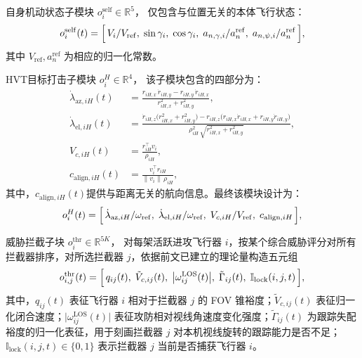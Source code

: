 自身机动状态子模块 $o_i^{\mathrm{self}}\in\mathbb{R}^{5}$，
仅包含与位置无关的本体飞行状态：
\begin{equation}
o_i^{\mathrm{self}}(t)=\Bigl[\,V_i/V_{\mathrm{ref}},\;\sin\gamma_i,\;\cos\gamma_i,\;a_{n,\gamma,i}/a^{\mathrm{ref}}_n,\;a_{n,\psi,i}/a^{\mathrm{ref}}_n\,\Bigr],
\label{eq:obs-self}
\end{equation}
其中 $V_{\mathrm{ref}},a^{\mathrm{ref}}_n$ 为相应的归一化常数。

HVT目标打击子模块 $o_i^{H}\in\mathbb{R}^{4}$，
该子模块包含的四部分为：
\begin{align}
\dot\lambda_{\mathrm{az},iH}(t)&=\frac{r_{iH,x}\,\dot r_{iH,y}-r_{iH,y}\,\dot r_{iH,x}}{r_{iH,x}^{2}+r_{iH,y}^{2}},
\label{eq:los-az}\\
\dot\lambda_{\mathrm{el},iH}(t)&=\frac{\dot r_{iH,z}\bigl(r_{iH,x}^{2}+r_{iH,y}^{2}\bigr)
-r_{iH,z}\bigl(r_{iH,x}\dot r_{iH,x}+r_{iH,y}\dot r_{iH,y}\bigr)}{\rho_{iH}^{2}\,\sqrt{r_{iH,x}^{2}+r_{iH,y}^{2}}},
\label{eq:los-el}\\
V_{c,iH}(t)&=\frac{r_{iH}^{\top}v_i}{\rho_{iH}},
\label{eq:vc-h}\\
c_{\mathrm{align},iH}(t)&=\frac{v_i^{\top}r_{iH}}{\|v_i\|\,\rho_{iH}},
\label{eq:cos-align}
\end{align}
其中，$c_{\mathrm{align},iH}(t)$提供与距离无关的航向信息。最终该模块设计为：
\begin{equation}
o_i^{H}(t)=\Bigl[\,\dot\lambda_{\mathrm{az},iH}/\omega_{\mathrm{ref}},\;\dot\lambda_{\mathrm{el},iH}/\omega_{\mathrm{ref}},\;V_{c,iH}/V_{\mathrm{ref}},\;c_{\mathrm{align},iH}\,\Bigr],
\end{equation}


威胁拦截子块 $o_i^{\mathrm{thr}}\in\mathbb{R}^{5K}$，
对每架活跃进攻飞行器 $i$，按某个综合威胁评分对所有拦截器排序，对所选拦截器 $j$，依据前文已建立的理论量构造五元组
\begin{equation}
o_{i,j}^{\mathrm{thr}}(t)=
\Bigl[\,
q_{ij}(t),\;
\tilde V_{c,ij}(t),\;
\bigl|\omega_{ij}^{\mathrm{LOS}}(t)\bigr|,\;
\tilde\Gamma_{ij}(t),\;
\mathbb{I}_{\mathrm{lock}}(i,j,t)
\,\Bigr],
\label{eq:obs-thr}
\end{equation}
其中，$q_{ij}(t)$ 表征飞行器 $i$ 相对于拦截器 $j$ 的 FOV 锥裕度；$\tilde V_{c,ij}(t)$ 表征归一化闭合速度；$\bigl|\omega_{ij}^{\mathrm{LOS}}(t)\bigr|$ 表征攻防相对视线角速度变化强度；$\tilde\Gamma_{ij}(t)$ 为跟踪失配裕度的归一化表征，用于刻画拦截器 $j$ 对本机视线旋转的跟踪能力是否不足；$\mathbb{I}_{\mathrm{lock}}(i,j,t)\in\{0,1\}$ 表示拦截器 $j$ 当前是否捕获飞行器 $i$。


